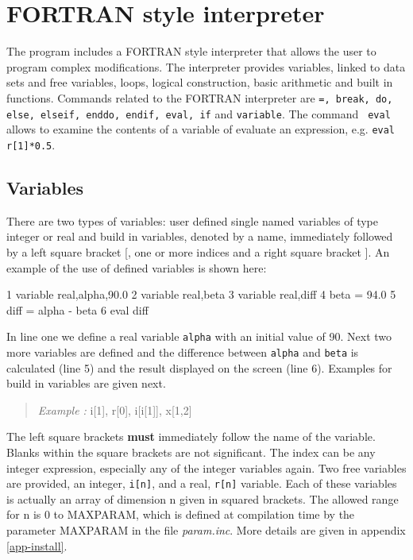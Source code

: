
\chapter{FORTRAN style interpreter \label{fort}}

The program includes a FORTRAN style interpreter that allows the
user to program complex modifications.  The interpreter provides
variables, linked to data sets and free variables, loops, logical
construction, basic arithmetic and built in functions.  Commands
related to the FORTRAN interpreter are {\tt =, break, do, else,
elseif, enddo, endif, eval, if} and {\tt variable}. The command {\tt
eval} allows to examine the contents of a variable of evaluate an
expression, e.g. {\tt eval r[1]*0.5}. \par


\section{Variables \label{var}}

There are two types of variables: user defined single named
variables of type integer or real and build in variables, denoted by
a name, immediately followed by a left square bracket [, one or more
indices and a right square bracket ]. An example of the use of
defined variables is shown here:
%
\begin{MacVerbatim}
   1  variable  real,alpha,90.0
   2  variable  real,beta
   3  variable  real,diff
   4  beta = 94.0
   5  diff = alpha - beta
   6  eval diff
\end{MacVerbatim}
%
In line one we define a real variable {\tt alpha} with an initial
value of 90. Next two more variables are defined and the difference
between {\tt alpha} and {\tt beta} is calculated (line 5) and the
result displayed on the screen (line 6). Examples for build in
variables are given next.

\begin{quote}
  {\it Example :\/} i[1], r[0], i[i[1]], x[1,2]
\end{quote}

The left square brackets {\bf must} immediately follow the name of
the variable.  Blanks within the square brackets are not
significant.  The index can be any integer expression, especially
any of the integer variables again.  Two free variables are
provided, an integer, {\tt i[n]}, and a real, {\tt r[n]} variable.
Each of these variables is actually an array of dimension n given in
squared brackets. The allowed range for n is 0 to MAXPARAM, which is
defined at compilation time by the parameter MAXPARAM in the file
{\it param.inc}. More details are given in appendix
\ref{app-install}. \par

